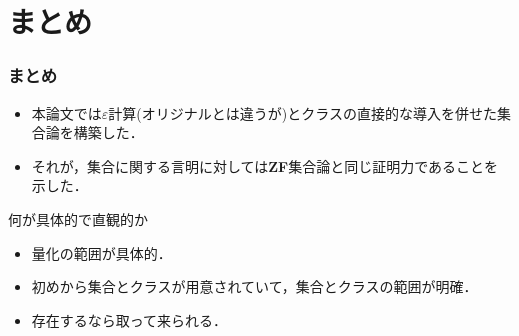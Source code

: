 \documentclass[dvipdfmx,10pt,notheorems]{beamer}
\theoremstyle{definition}
\begin{document}
\section{まとめ}
\begin{frame}\frametitle{まとめ}
	\begin{itemize}
		\item 本論文では$\varepsilon$計算(オリジナルとは違うが)とクラスの直接的な導入を併せた集合論を構築した．
		\item それが，集合に関する言明に対しては{\bf ZF}集合論と同じ証明力であることを示した．
	\end{itemize}
	
	\begin{block}{何が具体的で直観的か}
		\begin{itemize}
			\item 量化の範囲が具体的．
			\item 初めから集合とクラスが用意されていて，集合とクラスの範囲が明確．
			\item 存在するなら取って来られる．
		\end{itemize}
	\end{block}
\end{frame}


\end{document}
